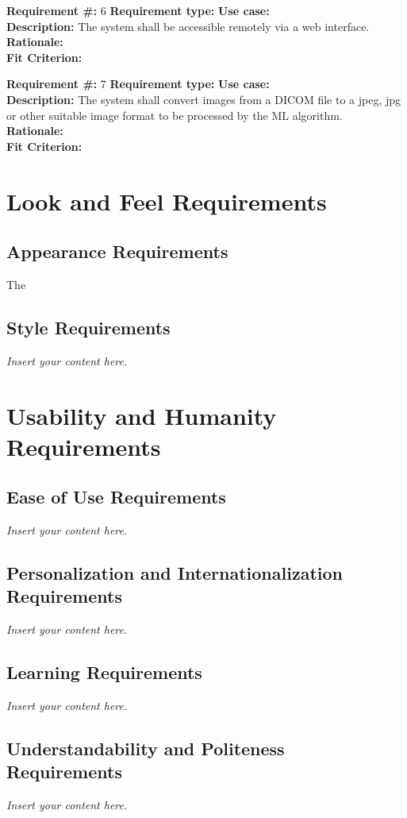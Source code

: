 \documentclass[12pt]{article}
\newcommand{\lips}{\textit{Insert your content here.}}
\begin{document}
\vspace{2mm}
\noindent
\textbf{Requirement \#:} 6 \hfill \textbf{Requirement type:} \hfill \textbf{Use case:} \\
\textbf{Description:} The system shall be accessible remotely via a web interface.   \\
\textbf{Rationale: } \\
\textbf{Fit Criterion:}

\vspace{2mm}
\noindent
\textbf{Requirement \#:} 7 \hfill \textbf{Requirement type:} \hfill \textbf{Use case:} \\
\textbf{Description:} The system shall convert images from a DICOM file to a jpeg, jpg or other suitable image format to be processed by the ML algorithm.  \\
\textbf{Rationale: } \\
\textbf{Fit Criterion:}

\section{Look and Feel Requirements}
\subsection{Appearance Requirements}
The 
\subsection{Style Requirements}
\lips

\section{Usability and Humanity Requirements}
\subsection{Ease of Use Requirements}
\lips
\subsection{Personalization and Internationalization Requirements}
\lips
\subsection{Learning Requirements}
\lips
\subsection{Understandability and Politeness Requirements}
\lips
\end{document}
